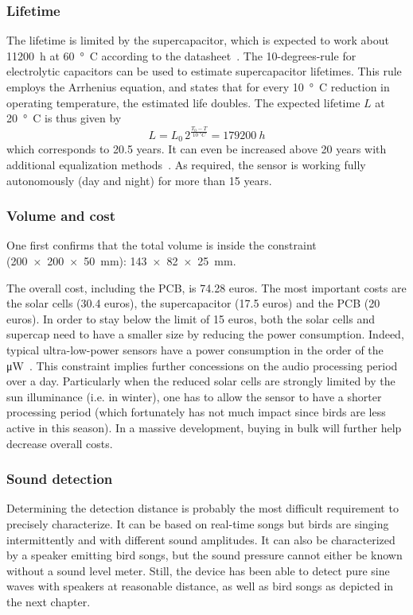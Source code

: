 \documentclass{EPL-master-thesis-covers-EN}
\begin{document}
\subsubsection*{Lifetime}

The lifetime is limited by the supercapacitor, which is expected to work about \SI{11200}{h} at \SI{60}{\degree C} according to the datasheet~\cite{Vishay}.   The 10-degrees-rule for electrolytic capacitors can be used to estimate supercapacitor lifetimes. This rule employs the Arrhenius equation, and states that for every \SI{10}{\degree C} reduction in operating temperature, the estimated life doubles. The expected lifetime $L$ at \SI{20}{\degree C} is thus given by
\[
 L = L_0 \, 2^{\frac{T_0-T}{\SI{10}{\degree C}}} = \SI{179200}{h}
\]
which corresponds to 20.5 years. It can even be increased above 20 years with additional equalization methods~\cite{4494753}. As required, the sensor is working fully autonomously (day and night) for more than 15 years.

\subsubsection*{Volume and cost}

One first confirms that the total volume is inside the constraint (\SI{200 x 200 x 50}{mm}): \SI{143 x 82 x 25}{mm}.

The overall cost, including the PCB, is 74.28 euros. The most important costs are the solar cells (30.4 euros), the supercapacitor (17.5 euros) and the PCB (20 euros).  In order to stay below the limit of 15 euros, both the solar cells and supercap need to have a smaller size by reducing the power consumption. Indeed, typical ultra-low-power sensors have a power consumption in the order of the \si{\micro W}~\cite{DEKIMPE20198}. This constraint implies further concessions on the audio processing period over a day. Particularly when the reduced solar cells are strongly limited by the sun illuminance (i.e. in winter), one has to allow the sensor to have a shorter processing period (which fortunately has not much impact since birds are less active in this season). In a massive development, buying in bulk will further help decrease overall costs.


\subsubsection*{Sound detection}

Determining the detection distance is probably the most difficult requirement to precisely characterize. It can be based on real-time songs but birds are singing intermittently and with different sound amplitudes. It can also be characterized by a speaker emitting bird songs, but the sound pressure cannot either be known without a sound level meter. Still, the device has been able to detect pure sine waves with speakers at reasonable distance, as well as bird songs as depicted in the next chapter.
\end{document}
